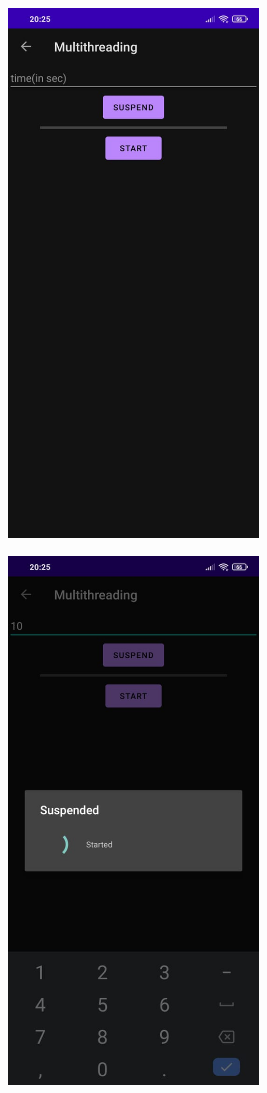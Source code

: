\documentclass[12pt,letterpaper]{article}
\begin{document}
\newpage
\subsection*{}
\begin{figure}[h]
    \centering
    \includegraphics[height=14cm, keepaspectratio]{Outputs/ProgressBar1.jpeg}
\end{figure}
\begin{figure}
    \centering
    \includegraphics[height=14cm, keepaspectratio]{Outputs/ProgressBar2.jpeg}
\end{figure}
\end{document}
